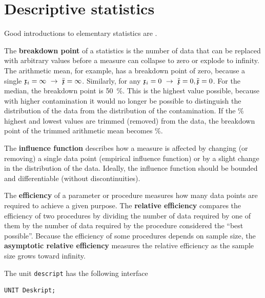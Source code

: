 \chapter{Descriptive statistics}
\begin{refsection}


Good introductions to elementary statistics are \parencite{Kre-79, Fre-65}.

The \textbf{breakdown point} of a statistics is the number of data that can be replaced with arbitrary values before a measure can collapse to zero or explode to infinity. The arithmetic mean, for example, has a breakdown point of zero, because a single \( \AbsVec{x}_i = \infty\ \rightarrow\ \bar{\AbsVec{x}} = \infty \). Similarly, for any \( \mathfrak{x}_i = 0\ \rightarrow\ \check{\mathfrak{x}} = 0, \tilde{\mathfrak{x}} = 0 \). For the median, the breakdown point is \SI{50}{\%}. This is the highest value possible, because with higher contamination it would no longer be possible to distinguish the distribution of the data from the distribution of the contamination. If the \si{\%} highest and lowest values are trimmed (removed) from the data, the breakdown point of the trimmed arithmetic mean becomes \si{\%}.

The \textbf{influence function} describes how a measure is affected by changing (or removing) a single data point (empirical influence function) or by a slight change in the distribution of the data. Ideally, the influence function should be bounded and differentiable (without discontinuities).

The \textbf{efficiency} of a parameter or procedure measures how many data points are required to achieve a given purpose. The \textbf{relative efficiency} compares the efficiency of two procedures by dividing the number of data required by one of them by the number of data required by the procedure considered the ``best possible''. Because the efficiency of some procedures depends on sample size, the \textbf{asymptotic relative efficiency} measures the relative efficiency as the sample size grows toward infinity.

The unit \texttt{descript} has the following interface
\begin{lstlisting}[caption=Interface of descript]
UNIT Deskript;


\end{lstlisting}
\end{refsection}
